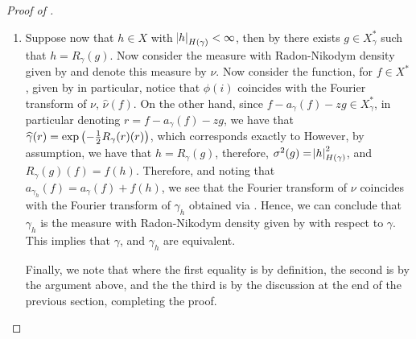 \documentclass[../main.tex]{subfiles}
\begin{document}
\begin{proof}[Proof of ]
\begin{enumerate}
    \item Suppose now that $h\in X$ with $\abs{h}_{H(\gamma)}<\infty$, then by  there exists $g\in X_\gamma^*$ such that $h = R_\gamma(g)$. Now consider the measure with Radon-Nikodym density given by  and denote this measure by $\nu$. Now consider the function, for $f\in X^*$, given by  in particular, notice that $\phi(i)$ coincides with the Fourier transform of $\nu$, $\hat\nu(f)$. On the other hand, since $f-a_\gamma(f) - zg\in X_\gamma^*$, in particular denoting $r = f-a_\gamma(f)-zg$, we have that $\hat\gamma(r) = \exp\del{-\frac12R_\gamma(r)(r)}$, which corresponds exactly to  However, by assumption, we have that $h = R_\gamma(g)$, therefore, $\sigma^2(g) = \abs{h}_{H(\gamma)}^2$, and $R_\gamma(g)(f) = f(h)$. Therefore,  and noting that $a_{\gamma_h}(f) = a_\gamma(f) + f(h)$, we see that the Fourier transform of $\nu$ coincides with the Fourier transform of $\gamma_h$ obtained via . Hence, we can conclude that $\gamma_h$ is the measure with Radon-Nikodym density given by  with respect to $\gamma$. This implies that $\gamma$, and $\gamma_h$ are equivalent.
    
    Finally, we note that  where the first equality is by definition, the second is by the argument above, and the the third is by the discussion at the end of the previous section, completing the proof.
\end{enumerate}

\end{proof}
\end{document}
